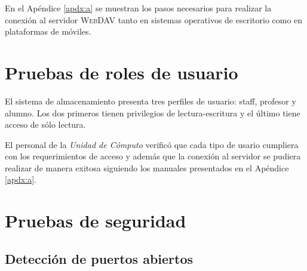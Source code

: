 En el \textup{Ap\'{e}ndice \ref{apdx:a}} se muestran los pasos necesarios para realizar la conexi\'{o}n al servidor \textsc{\gls{WebDAV}} tanto en sistemas operativos de escritorio como en plataformas de m\'{o}viles.

    \section {Pruebas de roles de usuario}

El sistema de almacenamiento presenta tres perfiles de usuario: staff, profesor y alumno. Los dos primeros tienen privilegios de lectura-escritura y el \'{u}ltimo tiene acceso de s\'{o}lo lectura.

El personal de la \emph{Unidad de C\'{o}mputo} verific\'{o} que cada tipo de usario cumpliera con los requerimientos de acceso y adem\'{a}s que la conexi\'{o}n al servidor se pudiera realizar de manera exitosa siguiendo los manuales presentados en el \textup{Ap\'{e}ndice \ref{apdx:a}}.

{
 \linespread{1}
 \begin{table}[H]
 \caption{Perfiles de usuario y tipo de acceso}{}
 \label{tab:user-profiles}
 \noindent{} %
 \end{table}
}

    \section {Pruebas de seguridad}

      \subsection {Detecci\'{o}n de puertos abiertos}

